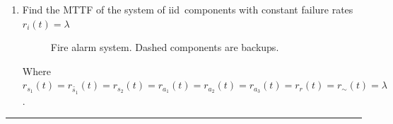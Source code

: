 \pagebreak

\begin{enumerate}[label = \alph*), resume]
    \item Find the \ac{MTTF} of the system of \ac{iid}~components with constant failure rates \(r_i(t) = \lambda \)

\begin{figure}[H]
    \centering
    \label{fig:diagram2}
    \caption{Fire alarm system. Dashed components are backups.}
\end{figure}

Where \(r_{s_1}(t) = r_{\tilde{s_1}}(t) = r_{s_2}(t) = r_{a_1}(t) = r_{a_2}(t) = r_{a_3}(t) = r_{r}(t)
= r_\sim(t) = \lambda\).

\end{enumerate}

\hrule
\medskip

%         
